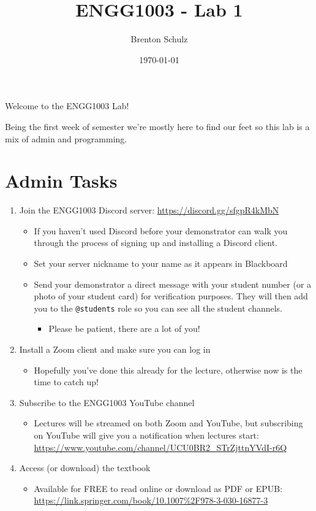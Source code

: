 \documentclass{lab}
\title{ENGG1003 - Lab 1}
\author{Brenton Schulz}
\date{\today}
\begin{document}
\maketitle

Welcome to the ENGG1003 Lab!

Being the first week of semester we're mostly here to find our feet so this lab is a mix of admin and programming.

\section{Admin Tasks}

\begin{enumerate}
\item Join the ENGG1003 Discord server: \url{https://discord.gg/sfgpR4kMbN}
	\begin{itemize}
		\item If you haven't used Discord before your demonstrator can walk you through the process of signing up and installing a Discord client.
		\item Set your server nickname to your name as it appears in Blackboard
		\item Send your demonstrator a direct message with your student number (or a photo of your student card) for verification purposes. They will then add you to the \texttt{@students} role so you can see all the student channels.
			\begin{itemize}
				\item Please be patient, there are a lot of you!
			\end{itemize}
	\end{itemize}
\item Install a Zoom client and make sure you can log in
	\begin{itemize}
		\item Hopefully you've done this already for the lecture, otherwise now is the time to catch up!
	\end{itemize}
\item Subscribe to the ENGG1003 YouTube channel
	\begin{itemize}
		\item Lectures will be streamed on both Zoom and YouTube, but subscribing on YouTube will give you a notification when lectures start: \url{https://www.youtube.com/channel/UCU0BR2_STrZjttnYVdI-r6Q}
	\end{itemize}
\item Access (or download) the textbook
	\begin{itemize}
		\item Available for FREE to read online or download as PDF or EPUB: \url{https://link.springer.com/book/10.1007%2F978-3-030-16877-3}
	\end{itemize}
\end{enumerate}
\end{document}

